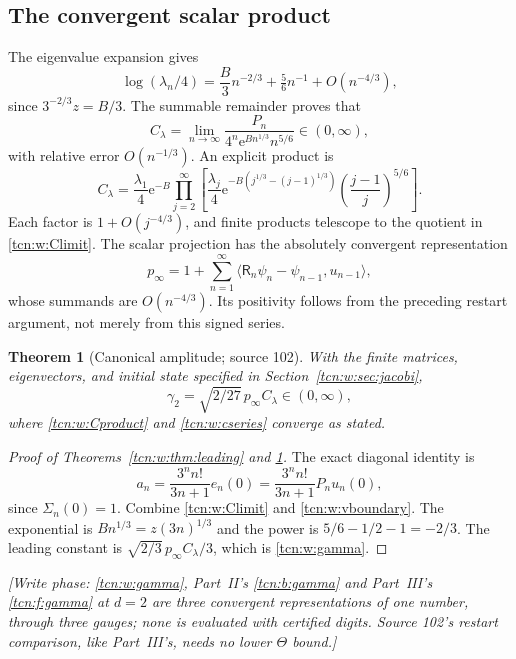 \documentclass[11pt,letterpaper]{article}
\newcommand{\ip}[2]{\langle#1,#2\rangle}
\newcommand{\ee}{\mathrm e}
\newtheorem{theorem}{Theorem}[section]
\theoremstyle{remark}
\begin{document}
\subsection{The convergent scalar product}
The eigenvalue expansion gives
\[
 \log(\lambda_n/4)=\frac B3n^{-2/3}+\tfrac56n^{-1}+O(n^{-4/3}),
\]
since $3^{-2/3}z=B/3$. The summable remainder proves that
\begin{equation}\label{tcn:w:Climit}
 C_\lambda=\lim_{n\to\infty}
 \frac{P_n}{4^n\ee^{Bn^{1/3}}n^{5/6}}
 \in(0,\infty),
\end{equation}
with relative error $O(n^{-1/3})$. An explicit product is
\begin{equation}\label{tcn:w:Cproduct}
 C_\lambda=\frac{\lambda_1}{4}\ee^{-B}
 \prod_{j=2}^\infty\left[
 \frac{\lambda_j}{4}
 \ee^{-B(j^{1/3}-(j-1)^{1/3})}
 \left(\frac{j-1}{j}\right)^{5/6}\right].
\end{equation}
Each factor is $1+O(j^{-4/3})$, and finite products telescope to the quotient in \eqref{tcn:w:Climit}. The scalar projection has the absolutely convergent representation
\begin{equation}\label{tcn:w:cseries}
 p_\infty=1+\sum_{n=1}^\infty
       \ip{\mathsf R_n\psi_n-\psi_{n-1}}{u_{n-1}},
\end{equation}
whose summands are $O(n^{-4/3})$. Its positivity follows from the preceding restart argument, not merely from this signed series.
\begin{theorem}[Canonical amplitude; source 102]\label{tcn:w:thm:constant}
With the finite matrices, eigenvectors, and initial state specified in Section~\ref{tcn:w:sec:jacobi},
\begin{equation}\label{tcn:w:gamma}
 \gamma_2=\sqrt{2/27}\,p_\infty C_\lambda\in(0,\infty),
\end{equation}
where \eqref{tcn:w:Cproduct} and \eqref{tcn:w:cseries} converge as stated.
\end{theorem}
\begin{proof}[Proof of Theorems~\ref{tcn:w:thm:leading} and \ref{tcn:w:thm:constant}]
The exact diagonal identity is
\[
 a_n=\frac{3^n n!}{3n+1}e_n(0)
     =\frac{3^n n!}{3n+1}P_nu_n(0),
\]
since $\Sigma_n(0)=1$. Combine \eqref{tcn:w:Climit} and \eqref{tcn:w:vboundary}. The exponential is $Bn^{1/3}=z(3n)^{1/3}$ and the power is $5/6-1/2-1=-2/3$. The leading constant is $\sqrt{2/3}\,p_\infty C_\lambda/3$, which is \eqref{tcn:w:gamma}.
\end{proof}
\emph{[Write phase: \eqref{tcn:w:gamma}, Part~II's \eqref{tcn:b:gamma} and Part~III's \eqref{tcn:f:gamma} at $d=2$ are three convergent representations of one number, through three gauges; none is evaluated with certified digits. Source 102's restart comparison, like Part~III's, needs no lower $\Theta$ bound.]}
\end{document}

